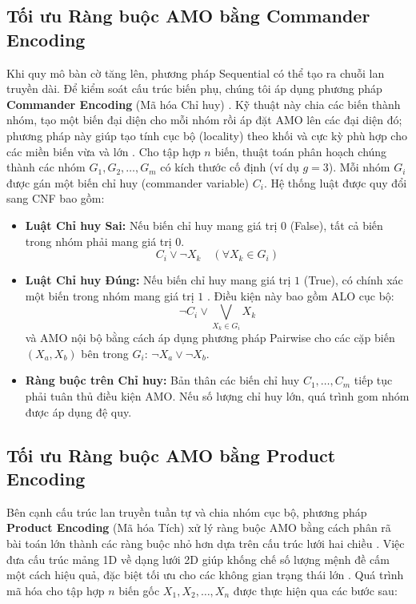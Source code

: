 \documentclass[a4paper,fleqn,numbers]{cas-sc}
\begin{document}
    \subsection{Tối ưu Ràng buộc AMO bằng Commander Encoding}\label{subsec:amo_cmd}
    Khi quy mô bàn cờ tăng lên, phương pháp Sequential có thể tạo ra chuỗi lan truyền dài. Để kiểm soát cấu trúc biến
    phụ, chúng tôi áp dụng phương pháp \textbf{Commander Encoding} (Mã hóa Chỉ huy)
    . Kỹ thuật này chia các biến thành nhóm, tạo một biến
    đại diện cho mỗi nhóm rồi áp đặt AMO lên các đại diện đó; phương pháp này giúp tạo tính cục bộ (locality) theo
    khối và cực kỳ phù hợp cho các miền biến vừa và lớn \cite{ref_13}. Cho tập hợp $n$ biến, thuật toán phân hoạch chúng
    thành các nhóm $G_1, G_2, \dots, G_m$ có kích thước cố định (ví dụ $g = 3$). Mỗi nhóm $G_i$
    được gán một biến chỉ huy
    (commander variable) $C_i$. Hệ thống luật được quy đổi sang CNF bao gồm:
    \begin{itemize}
        \item \textbf{Luật Chỉ huy Sai:}
        Nếu biến chỉ huy mang giá trị $0$ (False), tất cả biến trong nhóm phải mang giá trị $0$.
        \begin{equation}\label{eq:cmd_false}
            C_i \lor \neg X_k \quad (\forall X_k \in G_i)
        \end{equation}
        \item \textbf{Luật Chỉ huy Đúng:}
        Nếu biến chỉ huy mang giá trị $1$ (True), có chính xác một biến trong nhóm mang giá trị $1$
        . Điều kiện này bao gồm
        ALO cục bộ:
        \begin{equation}\label{eq:cmd_true}
            \neg C_i \lor \bigvee_{X_k \in G_i} X_k
        \end{equation}
        và AMO nội bộ bằng cách áp dụng phương pháp Pairwise cho các cặp biến $(X_a, X_b)$ bên trong $G_i$:
        $\neg X_a \lor \neg X_b$.
        \item \textbf{Ràng buộc trên Chỉ huy:} Bản thân các biến chỉ huy $C_1, \dots, C_m$
        tiếp tục phải tuân thủ điều kiện AMO. Nếu số lượng chỉ huy lớn, quá trình gom nhóm được áp dụng đệ quy.
    \end{itemize}

    \subsection{Tối ưu Ràng buộc AMO bằng Product Encoding}\label{subsec:amo_product}
    Bên cạnh cấu trúc lan truyền tuần tự và chia nhóm cục bộ, phương pháp \textbf{Product Encoding} (Mã hóa Tích) xử lý
    ràng buộc AMO bằng cách phân rã bài toán lớn thành các ràng buộc nhỏ hơn dựa trên cấu trúc lưới hai chiều
    \cite{ref_2}. Việc đưa cấu trúc mảng 1D về dạng lưới 2D giúp khống chế số lượng mệnh đề cấm một cách hiệu quả, đặc
    biệt tối ưu cho các không gian trạng thái lớn \cite{ref_3}. Quá trình mã hóa cho tập hợp $n$ biến gốc $X_1, X_2,
    \dots, X_n$ được thực hiện qua các bước sau:
\end{document}
